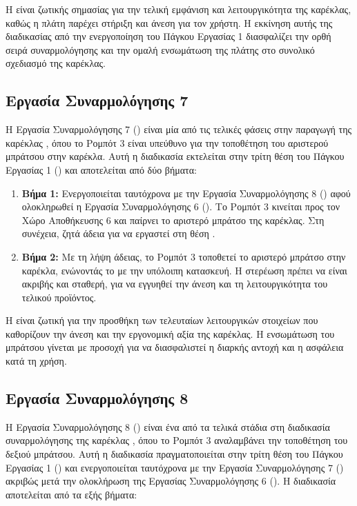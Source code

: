 Η  είναι ζωτικής σημασίας για την τελική εμφάνιση και λειτουργικότητα της καρέκλας, καθώς η πλάτη παρέχει στήριξη και άνεση για τον χρήστη. Η εκκίνηση αυτής της διαδικασίας από την ενεργοποίηση του Πάγκου Εργασίας 1 διασφαλίζει την ορθή σειρά συναρμολόγησης και την ομαλή ενσωμάτωση της πλάτης στο συνολικό σχεδιασμό της καρέκλας.

\subsection{Εργασία Συναρμολόγησης 7}
\noindent Η Εργασία Συναρμολόγησης 7 () είναι μία από τις τελικές φάσεις στην παραγωγή της καρέκλας , όπου το Ρομπότ 3 είναι υπεύθυνο για την τοποθέτηση του αριστερού μπράτσου στην καρέκλα. Αυτή η διαδικασία εκτελείται στην τρίτη θέση του Πάγκου Εργασίας 1 () και αποτελείται από δύο βήματα:

\begin{enumerate}
    \item \textbf{Βήμα 1:} Ενεργοποιείται ταυτόχρονα με την Εργασία Συναρμολόγησης 8 () αφού ολοκληρωθεί η Εργασία Συναρμολόγησης 6 (). Το Ρομπότ 3 κινείται προς τον Χώρο Αποθήκευσης 6 και παίρνει το αριστερό μπράτσο της καρέκλας. Στη συνέχεια, ζητά άδεια για να εργαστεί στη θέση .
    \item \textbf{Βήμα 2:} Με τη λήψη άδειας, το Ρομπότ 3 τοποθετεί το αριστερό μπράτσο στην καρέκλα, ενώνοντάς το με την υπόλοιπη κατασκευή. Η στερέωση πρέπει να είναι ακριβής και σταθερή, για να εγγυηθεί την άνεση και τη λειτουργικότητα του τελικού προϊόντος.
\end{enumerate}

Η  είναι ζωτική για την προσθήκη των τελευταίων λειτουργικών στοιχείων που καθορίζουν την άνεση και την εργονομική αξία της καρέκλας. Η ενσωμάτωση του μπράτσου γίνεται με προσοχή για να διασφαλιστεί η διαρκής αντοχή και η ασφάλεια κατά τη χρήση.

\subsection{Εργασία Συναρμολόγησης 8}
\noindent Η Εργασία Συναρμολόγησης 8 () είναι ένα από τα τελικά στάδια στη διαδικασία συναρμολόγησης της καρέκλας , όπου το Ρομπότ 3 αναλαμβάνει την τοποθέτηση του δεξιού μπράτσου. Αυτή η διαδικασία πραγματοποιείται στην τρίτη θέση του Πάγκου Εργασίας 1 () και ενεργοποιείται ταυτόχρονα με την Εργασία Συναρμολόγησης 7 () ακριβώς μετά την ολοκλήρωση της Εργασίας Συναρμολόγησης 6 (). Η διαδικασία  αποτελείται από τα εξής βήματα:

